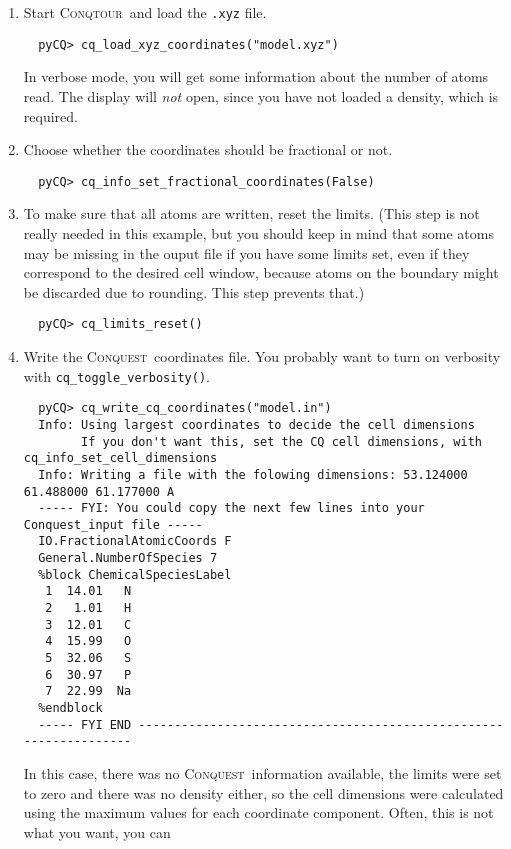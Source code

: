 \documentclass[a4paper,notitlepage,11pt]{article}
\def\CQ{\textsc{Conquest}}
\def\Conqtour{\textsc{Conqtour}}
\begin{document}
\begin{enumerate}
  \item Start \Conqtour\ and load the \texttt{.xyz} file.
{\scriptsize
  \begin{verbatim}
  pyCQ> cq_load_xyz_coordinates("model.xyz")
  \end{verbatim}
  }
  In verbose mode, you will get some information about the number of atoms read. The display will \emph{not} open, since you have
  not loaded a density, which is required.
  \item Choose whether the coordinates should be fractional or not.
{\scriptsize
  \begin{verbatim}
  pyCQ> cq_info_set_fractional_coordinates(False)
  \end{verbatim}
  }
  \item To make sure that all atoms are written, reset the limits. (This step is not really needed in this example, but you
  should keep in mind that some atoms may be missing in the ouput file if you have some limits set, even if they correspond to the
  desired cell window, because atoms on the boundary might be discarded due to rounding. This step prevents that.) 
  {\scriptsize
  \begin{verbatim}
  pyCQ> cq_limits_reset()  
  \end{verbatim}
  }
  \item Write the \CQ\ coordinates file. You probably want to turn on verbosity with \linebreak \texttt{cq\_toggle\_verbosity()}.
{\scriptsize
  \begin{verbatim}
  pyCQ> cq_write_cq_coordinates("model.in")
  Info: Using largest coordinates to decide the cell dimensions
        If you don't want this, set the CQ cell dimensions, with cq_info_set_cell_dimensions
  Info: Writing a file with the folowing dimensions: 53.124000 61.488000 61.177000 A
  ----- FYI: You could copy the next few lines into your Conquest_input file -----
  IO.FractionalAtomicCoords F
  General.NumberOfSpecies 7
  %block ChemicalSpeciesLabel
   1  14.01   N
   2   1.01   H
   3  12.01   C
   4  15.99   O
   5  32.06   S
   6  30.97   P
   7  22.99  Na
  %endblock
  ----- FYI END ------------------------------------------------------------------
  \end{verbatim}  
  }
  In this case, there was no \CQ\ information available, the limits were set to zero and there was no density either, so the cell
  dimensions were calculated using the maximum values for each coordinate component. Often, this is not what you want, you can

\end{enumerate}
\end{document}
